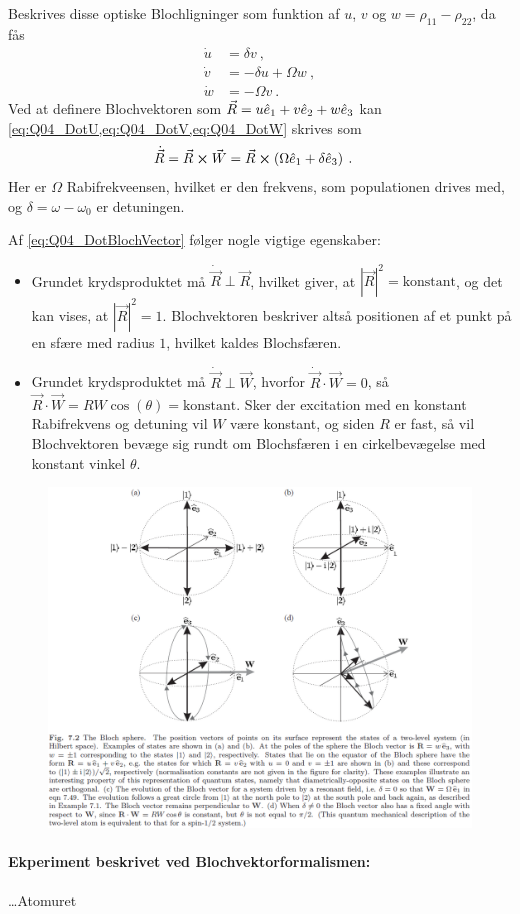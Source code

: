 Beskrives disse optiske Blochligninger som funktion af $u$, $v$ og $w = \rho_{11} - \rho_{22}$, da fås
\begin{align}
    \Dot{u} &= \delta v \: , \label{eq:Q04_DotU} \\
    \Dot{v} &= -\delta u + \Omega w \: , \label{eq:Q04_DotV} \\
    \Dot{w} &= -\Omega v \: . \label{eq:Q04_DotW}
\end{align}
Ved at definere \textsf{Blochvektoren} som $\Vec{R} = u\Hat{e}_1 + v\Hat{e}_2 + w\Hat{e}_3$ kan \cref{eq:Q04_DotU,eq:Q04_DotV,eq:Q04_DotW} skrives som
\begin{align} \label{eq:Q04_DotBlochVector}
    \Dot{\Vec{R}} &= \Vec{R} \cross \Vec{W} = \Vec{R} \cross \left(\Omega\Hat{e}_1 + \delta\Hat{e}_3\right) \: .
\end{align}
Her er $\Omega$ Rabifrekveensen, hvilket er den frekvens, som populationen drives med, og $\delta = \omega - \omega_0$ er detuningen.

Af \cref{eq:Q04_DotBlochVector} følger nogle vigtige egenskaber:
\begin{itemize}
    \item Grundet krydsproduktet må $\Dot{\Vec{R}} \perp \Vec{R}$, hvilket giver, at $|\Vec{R}|^2 = \text{konstant}$, og det kan vises, at $|\Vec{R}|^2 = 1$. Blochvektoren beskriver altså positionen af et punkt på en sfære med radius $1$, hvilket kaldes Blochsfæren.
    \item Grundet krydsproduktet må $\Dot{\Vec{R}} \perp \Vec{W}$, hvorfor $\Dot{\Vec{R}} \cdot \Vec{W} = 0$, så $\Vec{R} \cdot \Vec{W} = RW\cos(\theta) = \text{konstant}$. Sker der excitation med en konstant Rabifrekvens og detuning vil $W$ være konstant, og siden $R$ er fast, så vil Blochvektoren bevæge sig rundt om Blochsfæren i en cirkelbevægelse med konstant vinkel $\theta$.
\end{itemize}

\begin{figure}[!h]
    \centering
    \includegraphics[width=\textwidth]{Q04/images/BlochSphere.PNG}
    \caption{}
    \label{fig:Q04_BlochSphere}
\end{figure}


\paragraph{Ekperiment beskrivet ved Blochvektorformalismen:} \ldots Atomuret